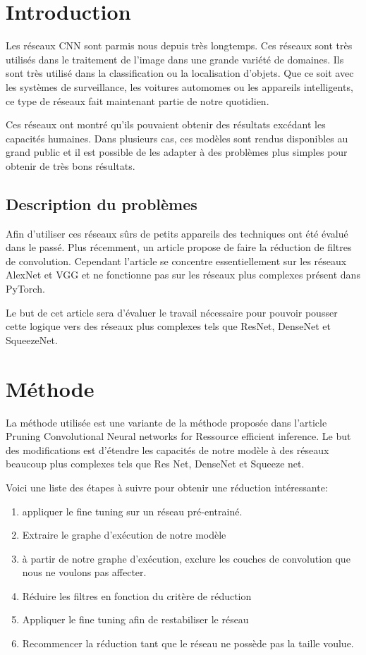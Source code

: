 \documentclass[12pt]{article}
\begin{document}
\section*{Introduction}
Les réseaux CNN sont parmis nous depuis très longtemps\cite{lecunn1}. Ces réseaux sont très utilisés dans le traitement de l'image dans une grande variété de domaines. Ils sont très utilisé dans la classification ou la localisation d'objets. Que ce soit avec les systèmes de surveillance, les voitures automomes ou les appareils intelligents, ce type de réseaux fait maintenant partie de notre quotidien\cite{daily}.

Ces réseaux ont montré qu’ils pouvaient obtenir des résultats excédant les capacités humaines\cite{beathuman}. Dans plusieurs cas, ces modèles sont rendus disponibles au grand public et il est possible de les adapter à des problèmes plus simples pour obtenir de très bons résultats\cite{transfer}. 

\subsection{Description du problèmes}
Afin d'utiliser ces réseaux sûrs de petits appareils des techniques\cite{han1} ont été évalué dans le passé. Plus récemment, un article propose de faire la réduction de filtres de convolution\cite{molchanov}. Cependant l'article se concentre essentiellement sur les réseaux AlexNet et VGG et ne fonctionne pas sur les réseaux plus complexes présent dans PyTorch\cite{pytorchmodel}.

Le but de cet article sera d'évaluer le travail nécessaire pour pouvoir pousser cette logique vers des réseaux plus complexes tels que ResNet, DenseNet et SqueezeNet. 

\section*{Méthode}
La méthode utilisée est une variante de la méthode proposée dans l'article Pruning Convolutional Neural networks for Ressource efficient inference\cite{molchanov}. Le but des modifications est d'étendre les capacités de notre modèle à des réseaux beaucoup plus complexes tels que Res Net, DenseNet et Squeeze net. 

Voici une liste des étapes à suivre pour obtenir une réduction intéressante: 
\begin{enumerate}
\item appliquer le fine tuning sur un réseau pré-entrainé. 
\item Extraire le graphe d'exécution de notre modèle 
\item à partir de notre graphe d'exécution, exclure les couches de convolution que nous ne voulons pas affecter. 
\item Réduire les filtres en fonction du critère de réduction 
\item Appliquer le fine tuning afin de restabiliser le réseau 
\item Recommencer la réduction tant que le réseau ne possède pas la taille voulue. 
\end{enumerate}
\end{document}
